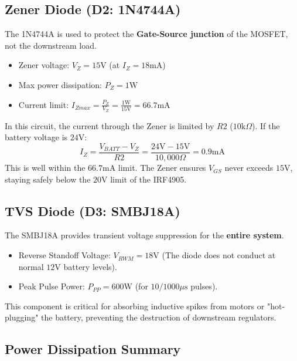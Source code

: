 \documentclass{article}
\begin{document}
\subsection{Zener Diode (D2: 1N4744A)}
The 1N4744A is used to protect the \textbf{Gate-Source junction} of the MOSFET, not the downstream load. 
\begin{itemize}
    \item Zener voltage: $V_{Z} = 15\text{V}$ (at $I_{Z} = 18\text{mA}$)
    \item Max power dissipation: $P_{Z} = 1\text{W}$
    \item Current limit: $I_{Zmax} = \frac{P_{Z}}{V_{Z}} = \frac{1\text{W}}{15\text{V}} = 66.7\text{mA}$
\end{itemize}

In this circuit, the current through the Zener is limited by $R2$ ($10\text{k}\Omega$). If the battery voltage is $24\text{V}$:
$$I_{Z} = \frac{V_{BATT} - V_{Z}}{R2} = \frac{24\text{V} - 15\text{V}}{10,000\Omega} = 0.9\text{mA}$$
This is well within the $66.7\text{mA}$ limit. The Zener ensures $V_{GS}$ never exceeds $15\text{V}$, staying safely below the $20\text{V}$ limit of the IRF4905.

\subsection{TVS Diode (D3: SMBJ18A)}
The SMBJ18A provides transient voltage suppression for the \textbf{entire system}.
\begin{itemize}
    \item Reverse Standoff Voltage: $V_{RWM} = 18\text{V}$ (The diode does not conduct at normal $12\text{V}$ battery levels).
    \item Peak Pulse Power: $P_{PP} = 600\text{W}$ (for $10/1000\mu\text{s}$ pulses).
\end{itemize}
This component is critical for absorbing inductive spikes from motors or "hot-plugging" the battery, preventing the destruction of downstream regulators.

\subsection{Power Dissipation Summary}
\end{document}
